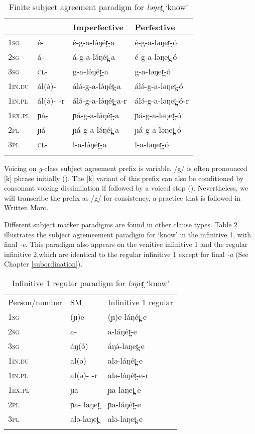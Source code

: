 \begin{table}
	\begin{tabular}[t]{llll}
	\lsptoprule
	& &		Imperfective &	Perfective\\
	\midrule
1\textsc{sg}	& é-	& 	é-g-a-lə́ŋét̪-a & é-g-a-ləŋet̪-ó\\
2\textsc{sg}	& á-	&	á-g-a-lə́ŋét̪-a & é-g-a-ləŋet̪-ó\\
3\textsc{sg}	& \textsc{cl}-	&	g-a-lə́ŋét̪-a	 & g-a-ləŋet̪-ó\\
1\textsc{in}.\textsc{du} & ál(ə́)-	 & 	álə́-g-a-lə́ŋét̪-a		& 	álə́-g-a-ləŋet̪-ó\\
1\textsc{in}.\textsc{pl} & ál(ə́)-	-r &  álə́-g-a-lə́ŋét̪-a-r	 & álə́-g-a-ləŋet̪-ó-r\\
1\textsc{ex}.\textsc{pl} & ɲá-	& ɲá-g-a-lə́ŋét̪-a & ɲá-g-a-ləŋet̪-ó\\
2\textsc{pl}	& ɲá 	&	ɲá-g-a-lə́ŋét̪-a & ɲá-g-a-ləŋet̪-ó\\
3\textsc{pl}	& \textsc{cl}-	&	l-a-lə́ŋét̪-a	 & l-a-ləŋet̪-ó \\
	\lspbottomrule
	\end{tabular}
	\caption{Finite subject agreement paradigm for \textit{ləŋet̪} `know'}
	\label{tab:ch11:agr2}
\end{table}
Voicing on \textit{g}-class subject agreement prefix is variable. /g/ is often pronounced [k] phrase initially (). The [k] variant of this prefix can also be conditioned by consonant voicing dissimilation if followed by a voiced stop (). Nevertheless, we will transcribe the prefix as /g/ for consistency, a practice that is followed in Written Moro.

Different subject marker paradigms are found in other clause types. Table \ref{tab:ch11:agr3} illustrates the subject agremeement paradigm for `know' in the infinitive 1, with final \textit{-e}. This paradigm also appears on the venitive infinitive 1 and the regular infinitive 2,which are identical to the regular infinitive 1 except for final \textit{-a} (See Chapter \ref{subordination}).

\begin{table}
	\begin{tabular}[t]{lll}
	\lsptoprule
Person/number & 	SM  & 		Infinitive 1 regular	\\ 
1\textsc{sg}		& 	(ɲ)e- 	& (ɲ)e-láŋét̪-e  		  \\
2\textsc{sg} 	&		a- 	& a-láŋét̪-e \\
3\textsc{sg}		& 	áŋ(ə́) 	& 	áŋə́-laŋet̪-e \\
1\textsc{in}.\textsc{du}	& 	al(ə)  	& 	alə-láŋét̪-e \\
1\textsc{in}.\textsc{pl}		&  al(ə)- -r & 	alə-láŋét̪-e-r\\
1\textsc{ex}.\textsc{pl}		& 	ɲa-  & 		ɲa-laŋet̪-e\\
2\textsc{pl}	& 	ɲa- laŋet̪ & 	ɲa-láŋét̪-e\\
3\textsc{pl} 	& 		alə-laŋet̪	& alə-laŋet̪-e\\
	\lspbottomrule
	\end{tabular}
	\caption{Infinitive 1 regular paradigm for \textit{ləŋet̪} `know'}
	\label{tab:ch11:agr3}
\end{table}

